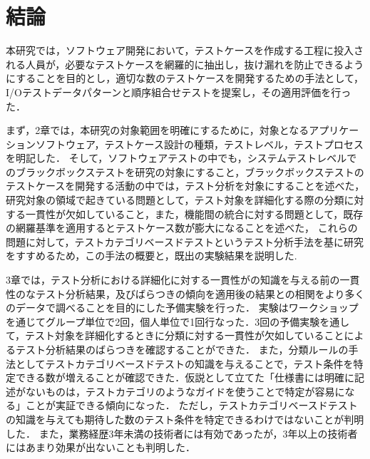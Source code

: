 \chapter{結論}

本研究では，ソフトウェア開発において，テストケースを作成する工程に投入される人員が，必要なテストケースを網羅的に抽出し，抜け漏れを防止できるようにすることを目的とし，適切な数のテストケースを開発するための手法として，I/Oテストデータパターンと順序組合せテストを提案し，その適用評価を行った．

まず，2章では，本研究の対象範囲を明確にするために，対象となるアプリケーションソフトウェア，テストケース設計の種類，テストレベル，テストプロセスを明記した．
そして，ソフトウェアテストの中でも，システムテストレベルでのブラックボックステストを研究の対象にすること，ブラックボックステストのテストケースを開発する活動の中では，テスト分析を対象にすることを述べた，
研究対象の領域で起きている問題として，テスト対象を詳細化する際の分類に対する一貫性が欠如していること，また，機能間の統合に対する問題として，既存の網羅基準を適用するとテストケース数が゙膨大になることを述べた，
これらの問題に対して，テストカテゴリベースドテストというテスト分析手法を基に研究をすすめるため，この手法の概要と，既出の実験結果を説明した.

3章では，テスト分析における詳細化に対する一貫性がの知識を与える前の一貫性のなテスト分析結果，及びばらつきの傾向を適用後の結果との相関をより多くのデータで調べることを目的にした予備実験を行った．
実験はワークショップを通じてグループ単位で2回，個人単位で1回行なった．3回の予備実験を通して，テスト対象を詳細化するときに分類に対する一貫性が欠如していることによるテスト分析結果のばらつきを確認することができた．
また，分類ルールの手法としてテストカテゴリベースドテストの知識を与えることで，テスト条件を特定できる数が増えることが確認できた．仮説として立てた「仕様書には明確に記述がないものは，テストカテゴリのようなガイドを使うことで特定が容易になる」ことが実証できる傾向になった．
ただし，テストカテゴリベースドテストの知識を与えても期待した数のテスト条件を特定できるわけではないことが判明した．
また，業務経歴3年未満の技術者には有効であったが，3年以上の技術者にはあまり効果が出ないことも判明した．

